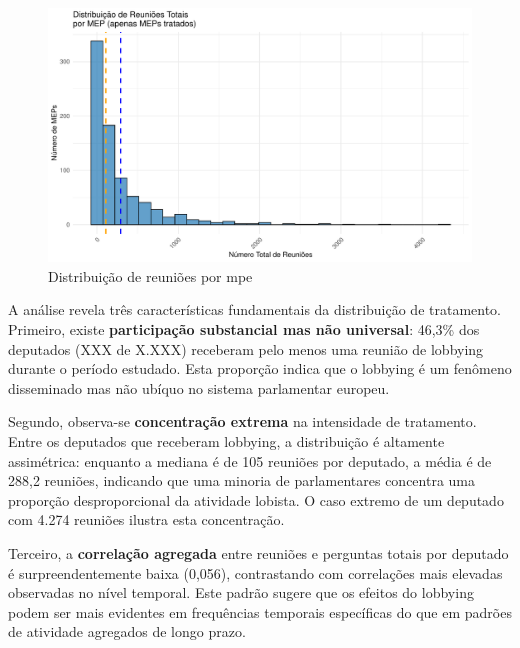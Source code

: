 \begin{figure}[htbp]
    \centering
    \includegraphics[width=\textwidth]{figures/fig3.1_meetings_hist.pdf}
    \caption{Distribuição de reuniões por \acrshort{mpe}}
    \label{fig:meetings_hist}
\end{figure}


A análise revela três características fundamentais da distribuição de tratamento. Primeiro, existe \textbf{participação substancial mas não universal}: 46,3\% dos deputados (XXX de X.XXX) receberam pelo menos uma reunião de lobbying durante o período estudado. Esta proporção indica que o lobbying é um fenômeno disseminado mas não ubíquo no sistema parlamentar europeu.

Segundo, observa-se \textbf{concentração extrema} na intensidade de tratamento. Entre os deputados que receberam lobbying, a distribuição é altamente assimétrica: enquanto a mediana é de 105 reuniões por deputado, a média é de 288,2 reuniões, indicando que uma minoria de parlamentares concentra uma proporção desproporcional da atividade lobista. O caso extremo de um deputado com 4.274 reuniões ilustra esta concentração.

Terceiro, a \textbf{correlação agregada} entre reuniões e perguntas totais por deputado é surpreendentemente baixa (0,056), contrastando com correlações mais elevadas observadas no nível temporal. Este padrão sugere que os efeitos do lobbying podem ser mais evidentes em frequências temporais específicas do que em padrões de atividade agregados de longo prazo.

